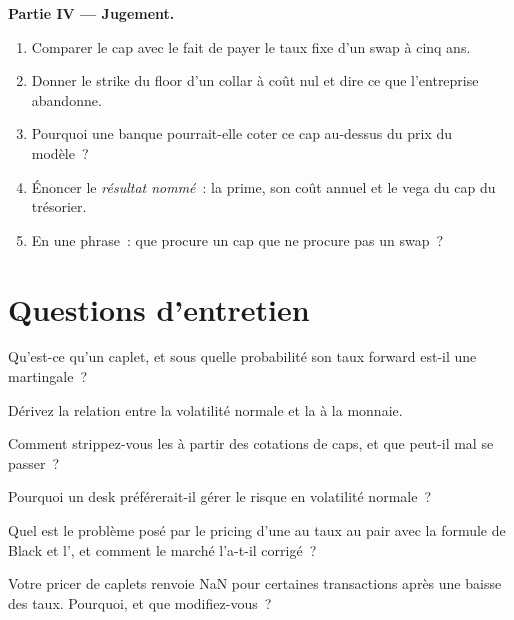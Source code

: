 \begin{problem}
\medskip\noindent\textbf{Partie IV --- Jugement.}
\begin{enumerate}[resume]
\item Comparer le cap avec le fait de payer le taux fixe d'un swap à cinq ans.
\item Donner le strike du floor d'un collar à coût nul et dire ce que l'entreprise
abandonne.
\item Pourquoi une banque pourrait-elle coter ce cap au-dessus du prix du modèle~?
\item Énoncer le \emph{résultat nommé}~: la prime, son coût annuel et le vega
du cap du trésorier.
\item En une phrase~: que procure un cap que ne procure pas un swap~?
\end{enumerate}
\end{problem}

\section{Questions d'entretien}

\begin{interviewq}\label{iq:rc:vanilla-rates-options:1}
Qu'est-ce qu'un caplet, et sous quelle probabilité son taux forward est-il une martingale~?
\end{interviewq}

\begin{interviewq}\label{iq:rc:vanilla-rates-options:2}
Dérivez la relation entre la volatilité normale et la  à la monnaie.
\end{interviewq}

\begin{interviewq}\label{iq:rc:vanilla-rates-options:3}
Comment strippez-vous les  à partir des cotations de caps, et que peut-il mal se passer~?
\end{interviewq}

\begin{interviewq}\label{iq:rc:vanilla-rates-options:4}
Pourquoi un desk préférerait-il gérer le risque en volatilité normale~?
\end{interviewq}

\begin{interviewq}\label{iq:rc:vanilla-rates-options:5}
Quel est le problème posé par le pricing d'une  au taux au pair avec
la formule de Black et l', et comment le marché l'a-t-il corrigé~?
\end{interviewq}

\begin{interviewq}\label{iq:rc:vanilla-rates-options:6}
Votre pricer de caplets renvoie NaN pour certaines transactions après une baisse des taux. Pourquoi, et que
modifiez-vous~?
\end{interviewq}
